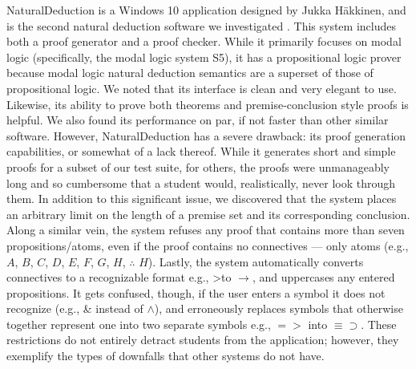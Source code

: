 \documentclass[ms]{uncgdissertationexp2}
\theoremstyle{plain}
\theoremstyle{definition}
\theoremstyle{remark}
\begin{document}
NaturalDeduction is a Windows 10 application designed by Jukka H\"akkinen, and is the second natural deduction software we investigated \cite{naturaldeduction}. This system includes both a proof generator and a proof checker. While it primarily focuses on modal logic (specifically, the modal logic system S5), it has a propositional logic prover because modal logic natural deduction semantics are a superset of those of propositional logic. We noted that its interface is clean and very elegant to use. Likewise, its ability to prove both theorems and premise-conclusion style proofs is helpful. We also found its performance on par, if not faster than other similar software. However, NaturalDeduction has a severe drawback: its proof generation capabilities, or somewhat of a lack thereof. While it generates short and simple proofs for a subset of our test suite, for others, the proofs were unmanageably long and so cumbersome that a student would, realistically, never look through them. In addition to this significant issue, we discovered that the system places an arbitrary limit on the length of a premise set and its corresponding conclusion. Along a similar vein, the system refuses any proof that contains more than seven propositions/atoms, even if the proof contains no connectives --- only atoms (e.g., $A$, $B$, $C$, $D$, $E$, $F$, $G$, $H$, $\therefore$ $H$). Lastly, the system automatically converts connectives to a recognizable format e.g., \textgreater\;to $\to$, and uppercases any entered propositions. It gets confused, though, if the user enters a symbol it does not recognize (e.g., \& instead of $\land$), and erroneously replaces symbols that otherwise together represent one into two separate symbols e.g., $=>$ into $\equiv\supset$. These restrictions do not entirely detract students from the application; however, they exemplify the types of downfalls that other systems do not have.
\end{document}
